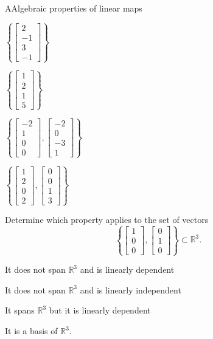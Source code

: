 \documentclass{article}
\newcommand{\IR}{\mathbb{R}}
\begin{document}
\begin{module}{A}{Algebraic properties of linear maps}
\begin{readinessAssuranceTest}
\begin{multicols}{4}
\begin{readinessAssuranceTestChoices}
\item $\left\{ \begin{bmatrix} 2 \\ -1 \\ 3 \\ -1 \end{bmatrix} \right\}$
\item $\left\{ \begin{bmatrix} 1 \\ 2 \\ 1 \\ 5 \end{bmatrix} \right\}$
\item $\left\{ \begin{bmatrix} -2 \\ 1 \\ 0 \\ 0 \end{bmatrix}, \begin{bmatrix} -2 \\ 0 \\ -3 \\ 1 \end{bmatrix} \right\}$%
\item $\left\{ \begin{bmatrix} 1 \\ 2 \\ 0 \\ 2 \end{bmatrix}, \begin{bmatrix} 0 \\ 0 \\ 1 \\ 3 \end{bmatrix} \right\}$
\end{readinessAssuranceTestChoices}
\end{multicols}


\item Determine which property applies to the set of vectors $$\left\{ \begin{bmatrix}  1 \\ 0 \\ 0 \end{bmatrix}, \begin{bmatrix} 0 \\ 1 \\ 0 \end{bmatrix} \right\} \subset \IR^3.$$
\begin{readinessAssuranceTestChoices}
\item It does not span \(\IR^3\) and is linearly dependent
\item It does not span \(\IR^3\) and is linearly independent %
\item It spans \(\IR^3\) but it is linearly dependent
\item It is a basis of \(\IR^3\).
\end{readinessAssuranceTestChoices}



\end{readinessAssuranceTest}
\end{module}
\end{document}

